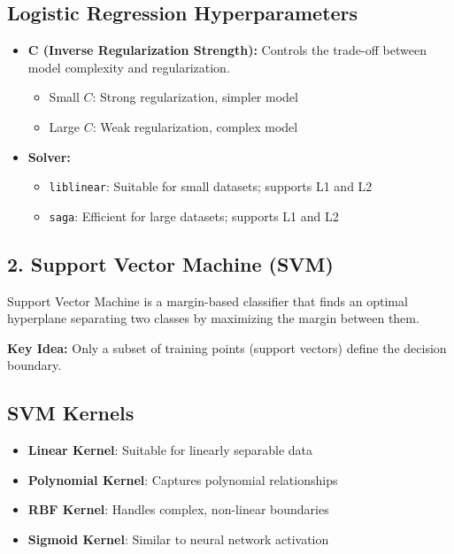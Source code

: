 \documentclass[11pt]{article}
\begin{document}
\subsection*{Logistic Regression Hyperparameters}
\begin{itemize}
    \item \textbf{C (Inverse Regularization Strength):} 
    Controls the trade-off between model complexity and regularization.
    \begin{itemize}
        \item Small $C$: Strong regularization, simpler model
        \item Large $C$: Weak regularization, complex model
    \end{itemize}

    \item \textbf{Solver:}
    \begin{itemize}
        \item \texttt{liblinear}: Suitable for small datasets; supports L1 and L2
        \item \texttt{saga}: Efficient for large datasets; supports L1 and L2
    \end{itemize}
\end{itemize}

\subsection*{2. Support Vector Machine (SVM)}
Support Vector Machine is a margin-based classifier that finds an optimal hyperplane separating two classes by maximizing the margin between them.



\textbf{Key Idea:} 
Only a subset of training points (support vectors) define the decision boundary.

\subsection*{SVM Kernels}
\begin{itemize}
    \item \textbf{Linear Kernel}: Suitable for linearly separable data
    \item \textbf{Polynomial Kernel}: Captures polynomial relationships
    \item \textbf{RBF Kernel}: Handles complex, non-linear boundaries
    \item \textbf{Sigmoid Kernel}: Similar to neural network activation
\end{itemize}
\end{document}
